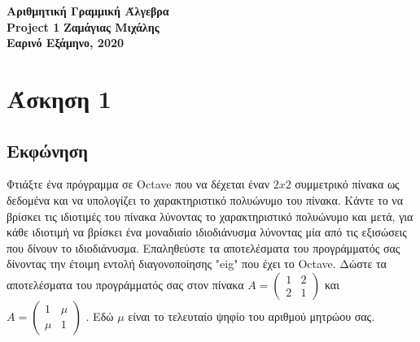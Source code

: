 \documentclass[a4paper,12pt]{article}
\begin{document}
\begin{titlepage}
    \begin{center}
        \vspace*{\fill}
        \huge{\textbf{Αριθμητική Γραμμική Άλγεβρα\\}}
        \vfill
        \huge{\textbf{Project 1}}
        \vspace*{\fill}
        \vfill
        \normalsize\textbf{Ζαμάγιας Μιχάλης\\}
        \small\textbf{Εαρινό Εξάμηνο, 2020\\}
        \vfill
    \end{center}
\end{titlepage}
\tableofcontents
\newpage\section{Άσκηση 1}
\subsection{Εκφώνηση}
Φτιάξτε ένα πρόγραμμα σε Octave που να δέχεται έναν ${2x2}$ συμμετρικό πίνακα ως δεδομένα και να
υπολογίζει το χαρακτηριστικό πολυώνυμο του πίνακα. Κάντε το να βρίσκει τις ιδιοτιμές του πίνακα
λύνοντας το χαρακτηριστικό πολυώνυμο και μετά, για κάθε ιδιοτιμή να βρίσκει ένα μοναδιαίο ιδιοδιάνυσμα
λύνοντας μία από τις εξισώσεις που δίνουν το ιδιοδιάνυσμα. Επαληθεύστε τα αποτελέσματα του προγράμματός
σας δίνοντας την έτοιμη εντολή διαγονοποίησης "eig" που έχει το Octave. Δώστε τα αποτελέσματα του
προγράμματός σας στον πίνακα
$
    A=\begin{pmatrix}
        1 & 2 \\
        2 & 1
    \end{pmatrix}
$
και
$
    A=\begin{pmatrix}
        1   & \mu \\
        \mu & 1
    \end{pmatrix}
$
. Εδώ ${\mu}$ είναι το τελευταίο ψηφίο του αριθμού μητρώου σας.
\end{document}
